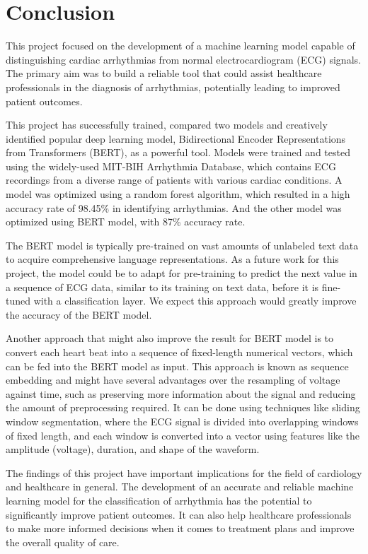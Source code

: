 \section{Conclusion}


This project focused on the development of a machine learning model capable of distinguishing cardiac arrhythmias from normal electrocardiogram (ECG) signals. The primary aim was to build a reliable tool that could assist healthcare professionals in the diagnosis of arrhythmias, potentially leading to improved patient outcomes.

This project has successfully trained, compared two models and creatively identified popular deep learning model, Bidirectional Encoder Representations from Transformers (BERT), as a powerful tool. Models were trained and tested using the widely-used MIT-BIH Arrhythmia Database, which contains ECG recordings from a diverse range of patients with various cardiac conditions. A model was optimized using a random forest algorithm, which resulted in a high accuracy rate of 98.45\% in identifying arrhythmias. And the other model was optimized using BERT model, with 87\% accuracy rate. 

The BERT model is typically pre-trained on vast amounts of unlabeled text data to acquire comprehensive language representations. As a future work for this project, the model could be to adapt for pre-training to predict the next value in a sequence of ECG data, similar to its training on text data, before it is fine-tuned with a classification layer. We expect this approach would greatly improve the accuracy of the BERT model.

Another approach that might also improve the result for BERT model is to convert each heart beat into a sequence of fixed-length numerical vectors, which can be fed into the BERT model as input. This approach is known as sequence embedding and might have several advantages over the resampling of voltage against time, such as preserving more information about the signal and reducing the amount of preprocessing required. It can be done using techniques like sliding window segmentation, where the ECG signal is divided into overlapping windows of fixed length, and each window is converted into a vector using features like the amplitude (voltage), duration, and shape of the waveform. 

The findings of this project have important implications for the field of cardiology and healthcare in general. The development of an accurate and reliable machine learning model for the classification of arrhythmia has the potential to significantly improve patient outcomes. It can also help healthcare professionals to make more informed decisions when it comes to treatment plans and improve the overall quality of care.

